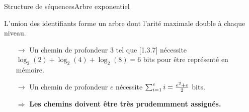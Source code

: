 \begin{frame}{Structure de séquences}{Arbre exponentiel}

  \begin{center}
    
  \end{center}

  L'union des identifiants forme un arbre dont l'arité maximale double à chaque
  niveau.
  
  \begin{itemize}
  \item [$\rightarrow$] Un chemin de profondeur 3 tel que [1.3.7] nécessite
    $\log_2(2)+\log_2(4)+\log_2(8)=6$ bits pour être représenté en mémoire.
  \item [$\rightarrow$] Un chemin de profondeur $e$ nécessite
    $\sum_{i=1}^e i = {e^2 + e \over 2}$ bits.
  \end{itemize}

  \vspace{0.25cm}
  \large
  \begin{itemize}
  \item [$\Rightarrow$] \textbf{Les chemins doivent être très prudemmment assignés.}
  \end{itemize}
    

\end{frame}


